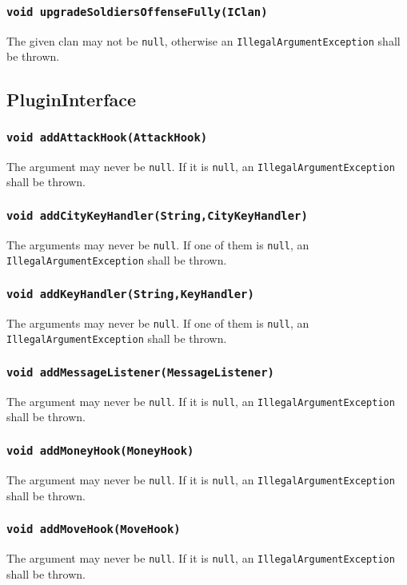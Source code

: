 \documentclass{article}
\begin{document}
\subsubsection{\texttt{void upgradeSoldiersOffenseFully(IClan)}}
The given clan may not be \texttt{null}, otherwise an \texttt{IllegalArgumentException}
shall be thrown.

\subsection{PluginInterface}

\subsubsection{\texttt{void addAttackHook(AttackHook)}}
The argument may never be \texttt{null}. If it is \texttt{null}, an \texttt{IllegalArgumentException}
shall be thrown.

\subsubsection{\texttt{void addCityKeyHandler(String,CityKeyHandler)}}
The arguments may never be \texttt{null}. If one of them is \texttt{null}, an \texttt{IllegalArgumentException}
shall be thrown.

\subsubsection{\texttt{void addKeyHandler(String,KeyHandler)}}
The arguments may never be \texttt{null}. If one of them is \texttt{null}, an \texttt{IllegalArgumentException}
shall be thrown.

\subsubsection{\texttt{void addMessageListener(MessageListener)}}
The argument may never be \texttt{null}. If it is \texttt{null}, an \texttt{IllegalArgumentException}
shall be thrown.

\subsubsection{\texttt{void addMoneyHook(MoneyHook)}}
The argument may never be \texttt{null}. If it is \texttt{null}, an \texttt{IllegalArgumentException}
shall be thrown.

\subsubsection{\texttt{void addMoveHook(MoveHook)}}
The argument may never be \texttt{null}. If it is \texttt{null}, an \texttt{IllegalArgumentException}
shall be thrown.
\end{document}
